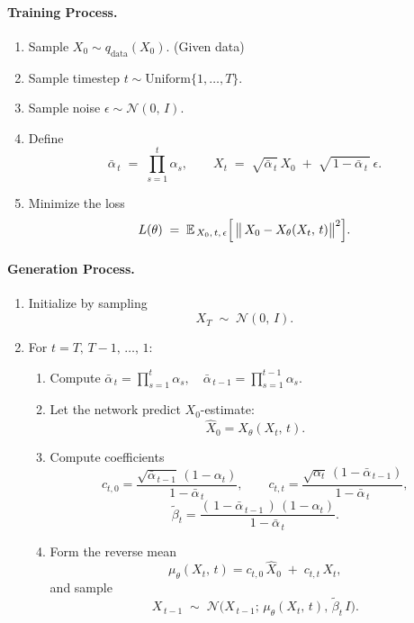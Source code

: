 \paragraph{Training Process.}
\begin{enumerate}
    \item Sample \(X_{0} \sim q_{\mathrm{data}}(X_{0})\). (Given data)
    \item Sample timestep \(t \sim \mathrm{Uniform}\{1,\dots,T\}\).
    \item Sample noise \(\epsilon \sim \mathcal{N}(0,\,I)\).
    \item Define
    \[
        \bar{\alpha}_{\,t} \;=\; \prod_{s=1}^{t} \alpha_{s}, 
        \qquad
        X_{t} \;=\; \sqrt{\bar{\alpha}_{\,t}}\,X_{0} \;+\; \sqrt{\,1 - \bar{\alpha}_{\,t}\,}\,\epsilon.
    \]
    \item Minimize the loss
    \[
        L(\theta)
        \;=\;
        \mathbb{E}_{\,X_{0},\,t,\,\epsilon}
        \Bigl[\,
            \bigl\lVert\,X_{0} - X_{\theta}(X_{t},\,t)\bigr\rVert^{2}
        \Bigr].
    \]
\end{enumerate}

\paragraph{Generation Process.}
\begin{enumerate}
    \item Initialize by sampling
    \[
        X_{T} \;\sim\; \mathcal{N}(0,\,I).
    \]
    \item For \(t = T,\,T-1,\,\dots,\,1\):
    \begin{enumerate}
        \item Compute 
        \(
          \bar{\alpha}_{\,t} = \prod_{s=1}^{t} \alpha_{s},
          \quad
          \bar{\alpha}_{\,t-1} = \prod_{s=1}^{t-1} \alpha_{s}.
        \)
        \item Let the network predict \(X_{0}\)-estimate:
        \[
            \widehat{X}_{0} 
            = X_{\theta}(X_{t},\,t).
        \]
        \item Compute coefficients
        \[
            c_{t,0}
            = \frac{\sqrt{\bar{\alpha}_{\,t-1}}\,(1 - \alpha_{t})}{\,1 - \bar{\alpha}_{\,t}\,},
            \qquad
            c_{t,t}
            = \frac{\sqrt{\alpha_{t}}\,(1 - \bar{\alpha}_{\,t-1})}{\,1 - \bar{\alpha}_{\,t}\,},
        \]
        \[
            \tilde{\beta}_{t}
            = \frac{(\,1 - \bar{\alpha}_{\,t-1}\,)\,(1 - \alpha_{t})}{\,1 - \bar{\alpha}_{\,t}\,}.
        \]
        \item Form the reverse mean
        \[
            \mu_{\theta}(X_{t},\,t)
            = c_{t,0}\,\widehat{X}_{0} \;+\; c_{t,t}\,X_{t},
        \]
        and sample
        \[
            X_{\,t-1} \;\sim\; 
            \mathcal{N}\bigl(
                X_{\,t-1};\,
                \mu_{\theta}(X_{t},\,t),\,
                \tilde{\beta}_{t}\,I
            \bigr).
        \]
    \end{enumerate}
\end{enumerate}


